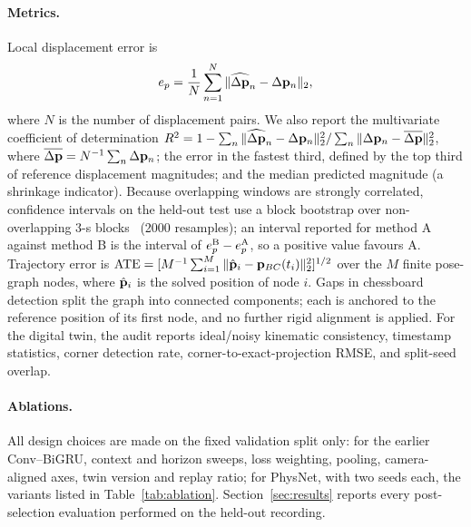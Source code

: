 \paragraph{Metrics.}
Local displacement error is
\begin{equation}
 e_p=\frac{1}{N}\sum_{n=1}^{N}
 \|\widehat{\Delta{\bf p}}_n-\Delta{\bf p}_n\|_2 ,
\end{equation}
where $N$ is the number of displacement pairs. We also report the
multivariate coefficient of determination
$R^2=1-\sum_n\|\widehat{\Delta{\bf p}}_n-\Delta{\bf p}_n\|_2^2/
\sum_n\|\Delta{\bf p}_n-\overline{\Delta{\bf p}}\|_2^2$, where
$\overline{\Delta{\bf p}}=N^{-1}\sum_n\Delta{\bf p}_n$; the error in the fastest
third, defined by the top third of reference displacement magnitudes; and the median
predicted magnitude (a shrinkage indicator). Because overlapping windows are
strongly correlated, confidence intervals on the held-out test use a block
bootstrap over non-overlapping 3-s blocks~\cite{carlstein1986use} (2000
resamples); an interval reported for method A against method B is the
interval of $e_p^{\rm B}-e_p^{\rm A}$, so a positive value favours A.
Trajectory error is
$\mathrm{ATE}=[M^{-1}\sum_{i=1}^{M}\|\hat{\bf p}_i-{\bf p}_{BC}(t_i)\|_2^2]^{1/2}$
over the $M$ finite pose-graph nodes, where $\hat{\bf p}_i$ is the solved
position of node $i$. Gaps in chessboard detection split the graph into
connected components; each is anchored to the reference position of its first
node, and no further rigid alignment is applied. For
the digital twin, the audit reports ideal/noisy kinematic consistency,
timestamp statistics, corner detection rate, corner-to-exact-projection RMSE,
and split-seed overlap.

\paragraph{Ablations.}
All design choices are made on the fixed validation split only: for the
earlier Conv--BiGRU, context and horizon sweeps, loss weighting, pooling,
camera-aligned axes, twin version and replay ratio; for PhysNet, with two
seeds each, the variants listed in Table~\ref{tab:ablation}.
Section~\ref{sec:results} reports every post-selection evaluation performed on
the held-out recording.
